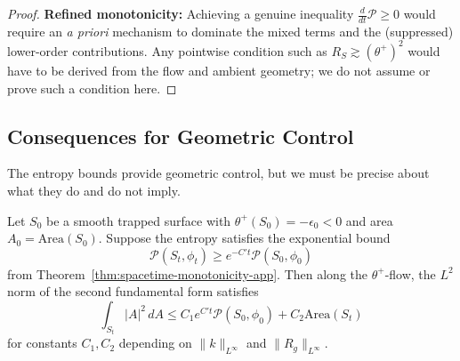 \begin{proof}
\textbf{Refined monotonicity:} Achieving a genuine inequality $\frac{d}{dt}\mathcal{P} \geq 0$ would require an 
\emph{a priori} mechanism to dominate the mixed terms and the (suppressed) lower-order contributions. Any pointwise condition such as $R_S \gtrsim (\theta^+)^2$ would have to be derived from the flow and ambient geometry; we do not assume or prove such a condition here.
\end{proof}

\subsection{Consequences for Geometric Control}

The entropy bounds provide geometric control, but we must be precise about what they do and do not imply.

\begin{corollary}
\label{cor:curvature-bounds-app}
Let $S_0$ be a smooth trapped surface with $\theta^+(S_0) = -\epsilon_0 < 0$ and area $A_0 = \mathrm{Area}(S_0)$. Suppose the entropy satisfies the exponential bound
\begin{equation}
\mathcal{P}(S_t, \phi_t) \geq e^{-C't}\mathcal{P}(S_0, \phi_0)
\end{equation}
from Theorem~\ref{thm:spacetime-monotonicity-app}. Then along the $\theta^+$-flow, the $L^2$ norm of the second fundamental form satisfies
\begin{equation}
\int_{S_t} |A|^2 \, dA \leq C_1 e^{C't}\mathcal{P}(S_0, \phi_0) + C_2 \mathrm{Area}(S_t)
\end{equation}
for constants $C_1, C_2$ depending on $\|k\|_{L^\infty}$ and $\|R_g\|_{L^\infty}$.
\end{corollary}

